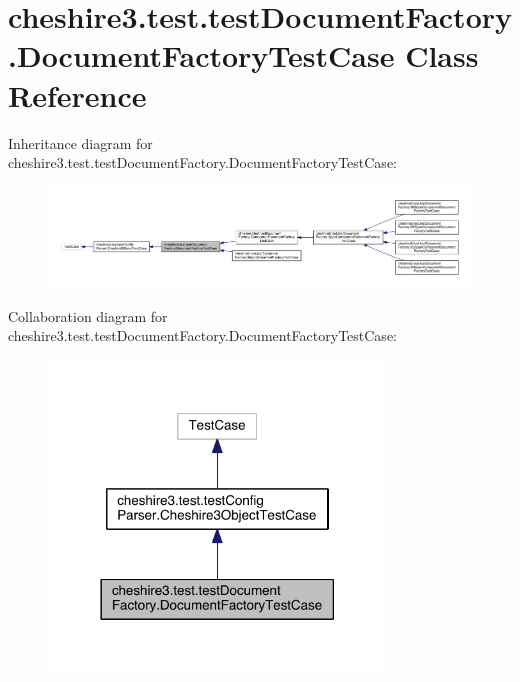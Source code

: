 \hypertarget{classcheshire3_1_1test_1_1test_document_factory_1_1_document_factory_test_case}{\section{cheshire3.\-test.\-test\-Document\-Factory.\-Document\-Factory\-Test\-Case Class Reference}
\label{classcheshire3_1_1test_1_1test_document_factory_1_1_document_factory_test_case}
}


Inheritance diagram for cheshire3.\-test.\-test\-Document\-Factory.\-Document\-Factory\-Test\-Case\-:
\nopagebreak
\begin{figure}[H]
\begin{center}
\leavevmode
\includegraphics[width=350pt]{classcheshire3_1_1test_1_1test_document_factory_1_1_document_factory_test_case__inherit__graph}
\end{center}
\end{figure}


Collaboration diagram for cheshire3.\-test.\-test\-Document\-Factory.\-Document\-Factory\-Test\-Case\-:
\nopagebreak
\begin{figure}[H]
\begin{center}
\leavevmode
\includegraphics[width=254pt]{classcheshire3_1_1test_1_1test_document_factory_1_1_document_factory_test_case__coll__graph}
\end{center}
\end{figure}
